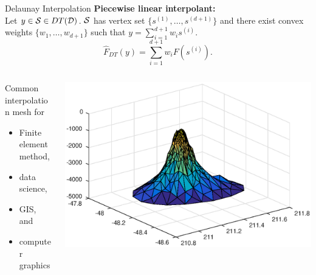\documentclass[xcolor=dvipsnames]{beamer}
\begin{document}
\begin{frame}{Delaunay Interpolation}
\textbf{Piecewise linear interpolant:}\\
Let $y \in {\cal S} \in DT({\cal D})$.
${\cal S}$ has vertex set $\{s^{(1)}, \ldots, s^{(d+1)}\}$ and there exist
convex weights $\{w_1, \ldots, w_{d+1}\}$ such that
$y = \sum_{i=1}^{d+1} w_i s^{(i)}$.
$$
{\hat F}_{DT}(y) = \sum_{i=1}^{d+1} w_i F(s^{(i)}).
$$
\medskip
\begin{columns}
\begin{column}{.48\textwidth}
Common interpolation mesh for
\begin{itemize}
\item Finite element method,
\item data science,
\item GIS, and
\item computer graphics
\end{itemize}
\end{column}
\begin{column}{.48\textwidth}
\hbox{\includegraphics[width=\textwidth]{seamount.eps}}
\end{column}
\end{columns}
\end{frame}
\end{document}
